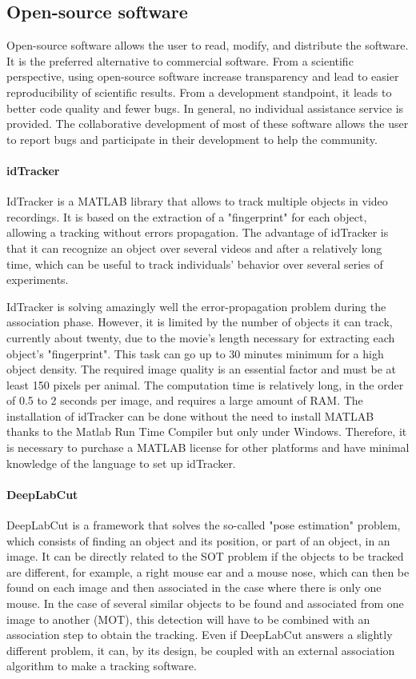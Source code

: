     \subsection{Open-source software}
    Open-source software allows the user to read, modify, and distribute the software. It is the preferred alternative to commercial software. From a scientific perspective, using open-source software increase transparency and lead to easier reproducibility of scientific results. From a development standpoint, it leads to better code quality and fewer bugs.
    In general, no individual assistance service is provided. The collaborative development of most of these software allows the user to report bugs and participate in their development to help the community.

    \paragraph{idTracker}
    IdTracker \cite{perez2014idtracker} is a MATLAB library that allows to track multiple objects in video recordings. It is based on the extraction of a "fingerprint" for each object, allowing a tracking without errors propagation. The advantage of idTracker is that it can recognize an object over several videos and after a relatively long time, which can be useful to track individuals' behavior over several series of experiments.

    IdTracker is solving amazingly well the error-propagation problem during the association phase. However, it is limited by the number of objects it can track, currently about twenty, due to the movie's length necessary for extracting each object's "fingerprint". This task can go up to 30 minutes minimum for a high object density. The required image quality is an essential factor and must be at least 150 pixels per animal. The computation time is relatively long, in the order of 0.5 to 2 seconds per image, and requires a large amount of RAM. The installation of idTracker can be done without the need to install MATLAB thanks to the Matlab Run Time Compiler but only under Windows. Therefore, it is necessary to purchase a MATLAB license for other platforms and have minimal knowledge of the language to set up idTracker.

    \paragraph{DeepLabCut}
    DeepLabCut \cite{mathis2018deeplabcut} is a framework that solves the so-called "pose estimation" problem, which consists of finding an object and its position, or part of an object, in an image. It can be directly related to the SOT problem if the objects to be tracked are different, for example, a right mouse ear and a mouse nose, which can then be found on each image and then associated in the case where there is only one mouse. In the case of several similar objects to be found and associated from one image to another (MOT), this detection will have to be combined with an association step to obtain the tracking. Even if DeepLabCut answers a slightly different problem, it can, by its design, be coupled with an external association algorithm to make a tracking software.

